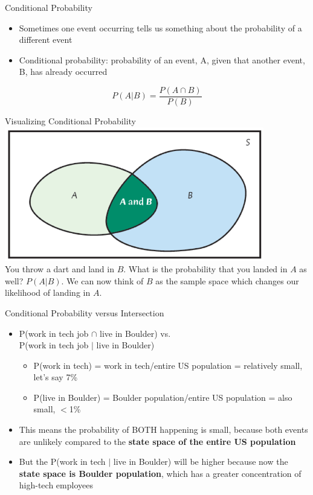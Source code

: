 \documentclass{beamer}
\begin{document}
\begin{frame}{Conditional Probability}
	
	\begin{itemize} 
		\item Sometimes one event occurring tells us something about the probability of a different event
		\item \alert{Conditional probability}: probability of an event, A, given that another event, B, has already occurred
	\end{itemize}
	$$P(A | B)= \frac{P(A \cap B)}{P(B)}$$
	
\end{frame}

\begin{frame}{Visualizing Conditional Probability}
	\includegraphics[width=0.85\textwidth]{simplevenndiagram} \\
	You throw a dart and land in $B$. What is the probability that you landed in $A$ as well? $P(A \vert B)$. We can now think of $B$ as the sample space which changes our likelihood of landing in $A$.
\end{frame}

\begin{frame}{Conditional Probability versus Intersection}
	\begin{itemize}
		\item P(work in tech job $\cap$ live in Boulder) vs. \\ P(work in tech job $\vert$ live in Boulder)
		      \begin{itemize}
		      	\item P(work in tech) = work in tech/entire US population = relatively small, let's say 7\%
		      	\item P(live in Boulder) = Boulder population/entire US population = also small, $<$1\%
		      \end{itemize}
		\item This means the probability of BOTH happening is small, because both events are unlikely compared to the \textbf{state space of the entire US population}
		\item But the P(work in tech $|$ live in Boulder) will be higher because now the \textbf{state space is Boulder population}, which has a greater concentration of high-tech employees
	\end{itemize}
\end{frame}
\end{document}
